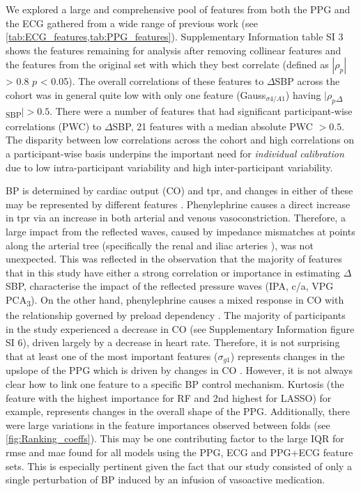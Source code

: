 \documentclass[fleqn,10pt]{wlscirep}
\begin{document}
We explored a large and comprehensive pool of features from both the PPG and the ECG gathered from a wide range of previous work (see \cref{tab:ECG_features,tab:PPG_features}). Supplementary Information table SI 3 shows the features remaining for analysis after removing collinear features and the features from the original set with which they best correlate (defined as $|\rho_p|$ > 0.8 $p$ < 0.05). The overall correlations of these features to $\Delta$SBP across the cohort was in general quite low with only one feature (Gauss$_{\sigma4/A1}$) having $|\rho_p$\textsubscript{$\Delta$SBP}$| > 0.5$. There were a number of features that had significant participant-wise correlations (PWC) to $\Delta$SBP, 21 features with a median absolute PWC $> 0.5$. The disparity between low correlations across the cohort and high correlations on a participant-wise basis underpins the important need for \textit{individual calibration} due to low intra-participant variability and high inter-participant variability. 


BP is determined by cardiac output (CO) and \ac{tpr}, and changes in either of these may be represented by different features \cite{Lin2020}. Phenylephrine causes a direct increase in \ac{tpr} \cite{Cannesson2012} via an increase in both arterial and venous vasoconstriction. Therefore, a large impact from the reflected waves, caused by impedance mismatches at points along the arterial tree (specifically the renal and iliac arteries \cite{Baruch2011}), was not unexpected. This was reflected in the observation that the majority of features that in this study have either a strong correlation or importance in estimating $\Delta$SBP, characterise the impact of the reflected pressure waves (IPA, c/a, VPG PCA\textsubscript{3}). On the other hand, phenylephrine causes a mixed response in CO with the relationship governed by preload dependency \cite{Cannesson2012}. The majority of participants in the study experienced a decrease in CO (see Supplementary Information figure SI 6), driven largely by a decrease in heart rate. Therefore, it is not surprising that at least one of the most important features ($\sigma_{g1}$) represents changes in the upslope of the PPG which is driven by changes in CO \cite{Lin2020}. However, it is not always clear how to link one feature to a specific BP control mechanism. Kurtosis (the feature with the highest importance for RF and 2nd highest for LASSO) for example, represents changes in the overall shape of the PPG. Additionally, there were large variations in the feature importances observed between folds (see \cref{fig:Ranking_coeffs}). This may be one contributing factor to the large IQR for \ac{rmse} and \ac{mae} found for all models using the PPG, ECG and PPG+ECG feature sets. This is especially pertinent given the fact that our study consisted of only a single perturbation of BP induced by an infusion of vasoactive medication. 
\end{document}
